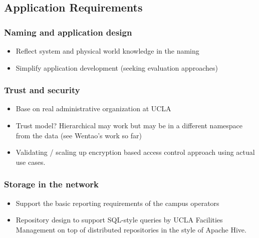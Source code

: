 \subsection{Application Requirements}



\subsubsection{Naming and application design}
\begin{itemize}
\item Reflect system and physical world knowledge in the naming 
\item Simplify application development (seeking evaluation approaches)
\end{itemize}

\subsubsection{Trust and security}
\begin{itemize}
\item Base on real administrative organization at UCLA
\item Trust model? Hierarchical may work but may be in a different namespace from the data  (see Wentao’s work so far) 
\item Validating / scaling up encryption based access control approach using actual use cases.
\end{itemize}

\subsubsection{Storage in the network}
\begin{itemize}
\item Support the basic reporting requirements of the campus operators
\item Repository design to support SQL-style queries by UCLA Facilities Management on top of distributed repositories in the style of Apache Hive. 
\end{itemize}
